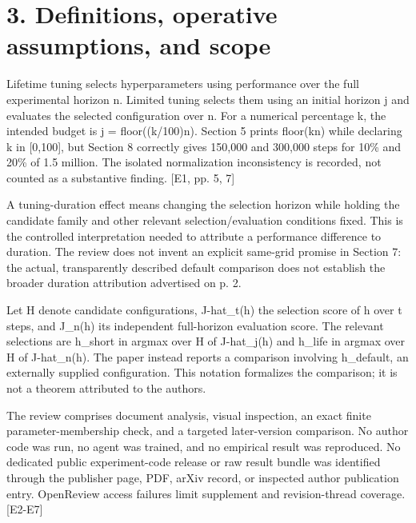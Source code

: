 \documentclass[10pt]{article}
\begin{document}
\section*{3. Definitions, operative assumptions, and scope}
Lifetime tuning selects hyperparameters using performance over the full experimental horizon n. Limited tuning selects them using an initial horizon j and evaluates the selected configuration over n. For a numerical percentage k, the intended budget is j = floor((k/100)n). Section 5 prints floor(kn) while declaring k in [0,100], but Section 8 correctly gives 150,000 and 300,000 steps for 10\% and 20\% of 1.5 million. The isolated normalization inconsistency is recorded, not counted as a substantive finding. [E1, pp. 5, 7]\par
A tuning-duration effect means changing the selection horizon while holding the candidate family and other relevant selection/evaluation conditions fixed. This is the controlled interpretation needed to attribute a performance difference to duration. The review does not invent an explicit same-grid promise in Section 7: the actual, transparently described default comparison does not establish the broader duration attribution advertised on p. 2.\par
Let H denote candidate configurations, J-hat\_t(h) the selection score of h over t steps, and J\_n(h) its independent full-horizon evaluation score. The relevant selections are h\_short in argmax over H of J-hat\_j(h) and h\_life in argmax over H of J-hat\_n(h). The paper instead reports a comparison involving h\_default, an externally supplied configuration. This notation formalizes the comparison; it is not a theorem attributed to the authors.\par
The review comprises document analysis, visual inspection, an exact finite parameter-membership check, and a targeted later-version comparison. No author code was run, no agent was trained, and no empirical result was reproduced. No dedicated public experiment-code release or raw result bundle was identified through the publisher page, PDF, arXiv record, or inspected author publication entry. OpenReview access failures limit supplement and revision-thread coverage. [E2-E7]\par
\end{document}
